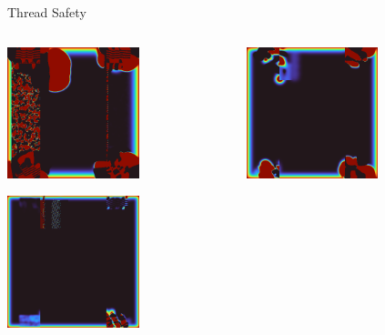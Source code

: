 \placelogofalse
\begin{frame}{Thread Safety}
  \begin{columns}
  \begin{center}
  \centering
  \includegraphics[width=0.6\textwidth]{glitch_01.png}

  \vspace{0.1cm}

  \includegraphics[width=0.6\textwidth]{glitch_02.png}
  \end{center}

  \begin{center}
  \centering
  \includegraphics[width=0.6\textwidth]{glitch_03.png}


\end{center}
\end{columns}
\end{frame}
